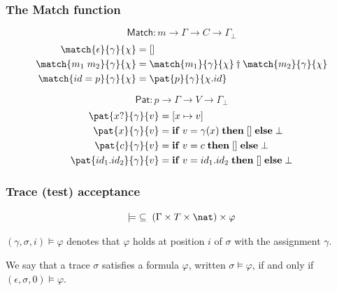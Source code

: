 \begin{frame}
  \frametitle{The Match function} \small

\[
\mathsf{Match}: m \rightarrow \Gamma \rightarrow C \rightarrow \Gamma_{\bot}
\]
\begin{align*}
\match{\epsilon}{\gamma}{\chi} &= [] \\
\match{m_1 \; m_2}{\gamma}{\chi} &= \match{m_1}{\gamma}{\chi} \dagger \match{m_2}{\gamma}{\chi}\\
\match{id = p}{\gamma}{\chi} &= \pat{p}{\gamma}{\chi.id}
\end{align*}

\pause

\[
\mathsf{Pat}: p \rightarrow \Gamma \rightarrow V \rightarrow \Gamma_{\bot}
\]
\begin{align*}
\pat{x?}{\gamma}{v} &= [x \mapsto v] \\
\pat{x}{\gamma}{v} &= {\bf if} \; v = \gamma(x) \; {\bf then} \; [] \; {\bf else} \; \bot\\
\pat{c}{\gamma}{v} &= {\bf if} \; v = c \; {\bf then} \; [] \; {\bf else} \; \bot\\
\pat{id_1.id_2}{\gamma}{v} &= {\bf if} \; v = id_1.id_2 \; {\bf then} \; [] \; {\bf else} \; \bot
\end{align*}

\end{frame}


\begin{frame}
  \frametitle{Trace (test) acceptance} \small

\begin{definition}

\[
\models \;\subseteq\; (\Gamma \times T \times \nat) \times \varphi
\]

\end{definition}

$( \gamma,\sigma,i) \models \varphi$ denotes that $\varphi$ holds at position $i$ of $\sigma$ with the assignment $\gamma$.

\pause

\begin{definition}

We say that a trace $\sigma$ satisfies a formula $\varphi$, written
$\sigma \models \varphi$, if and only if $(\epsilon, \sigma, 0) \models \varphi$.

\end{definition}

\end{frame}

